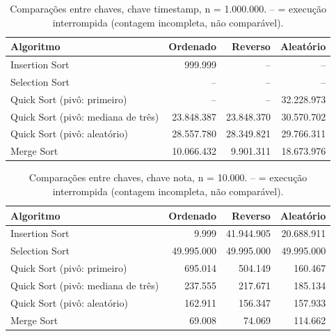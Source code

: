 \begin{table}[ht]
\centering
\caption{Compara\c{c}\~oes entre chaves, chave timestamp, n = 1.000.000. -- = execu\c{c}\~ao interrompida (contagem incompleta, n\~ao compar\'avel).}
\label{tab:comp-timestamp-1000000}
\begin{tabular}{lrrr}
\hline
Algoritmo & Ordenado & Reverso & Aleat\'orio \\
\hline
Insertion Sort & 999.999 & -- & -- \\
Selection Sort & -- & -- & -- \\
Quick Sort (piv\^o: primeiro) & -- & -- & 32.228.973 \\
Quick Sort (piv\^o: mediana de tr\^es) & 23.848.387 & 23.848.370 & 30.570.702 \\
Quick Sort (piv\^o: aleat\'orio) & 28.557.780 & 28.349.821 & 29.766.311 \\
Merge Sort & 10.066.432 & 9.901.311 & 18.673.976 \\
\hline
\end{tabular}
\end{table}

\begin{table}[ht]
\centering
\caption{Compara\c{c}\~oes entre chaves, chave nota, n = 10.000. -- = execu\c{c}\~ao interrompida (contagem incompleta, n\~ao compar\'avel).}
\label{tab:comp-nota-10000}
\begin{tabular}{lrrr}
\hline
Algoritmo & Ordenado & Reverso & Aleat\'orio \\
\hline
Insertion Sort & 9.999 & 41.944.905 & 20.688.911 \\
Selection Sort & 49.995.000 & 49.995.000 & 49.995.000 \\
Quick Sort (piv\^o: primeiro) & 695.014 & 504.149 & 160.467 \\
Quick Sort (piv\^o: mediana de tr\^es) & 237.555 & 217.671 & 185.134 \\
Quick Sort (piv\^o: aleat\'orio) & 162.911 & 156.347 & 157.933 \\
Merge Sort & 69.008 & 74.069 & 114.662 \\
\hline
\end{tabular}
\end{table}

